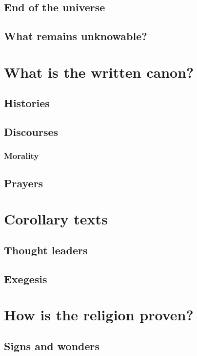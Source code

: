 \documentclass[12pt, letterpaper]{article}
\begin{document}
\subsection{End of the universe}

\subsection{What remains unknowable?}

\section{What is the written canon?}

\subsection{Histories}

\subsection{Discourses}

\subsubsection{Morality}

\subsection{Prayers}

\section{Corollary texts}

\subsection{Thought leaders}

\subsection{Exegesis}

\section{How is the religion proven?}

\subsection{Signs and wonders}
\end{document}
